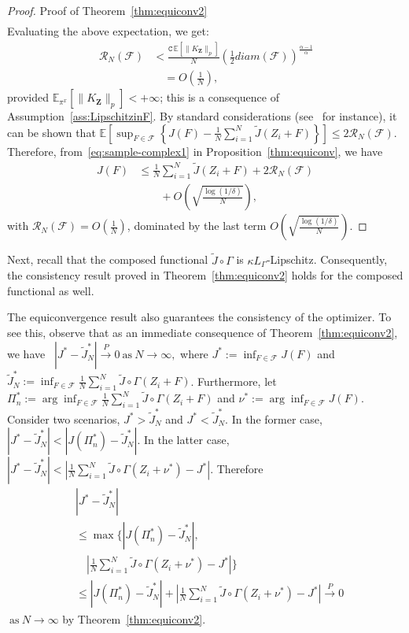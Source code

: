 \documentclass[11pt,leqno]{amsart}
\begin{document}
\begin{proof}{Proof of Theorem~\ref{thm:equiconv2}}
\begin{align*}
\end{align*}
Evaluating the above expectation, we get:
\begin{align}~\label{eq:gc}
    \mathcal{R}_N(\mathcal{F})& < \frac{\mathtt C \, \mathbb E \left[ \|K_{\mathbf Z}\|_{p} \right]}{N}\left(\frac{1}{2} diam(\mathcal F) \right)^{\frac{\alpha-1}{\alpha}}
    \\ &\nonumber\quad = O\left(\frac{1}{N}\right),
\end{align}
provided $\mathbb E_{\pi^x}\left[ \|K_{\mathbf Z}\|_{p}\right] < +\infty$; this is a consequence of Assumption~\ref{ass:LipschitzinF}. By standard considerations (see~\cite{bartlett2002rademacher} for instance), it can be shown that
\(
    \mathbb E\left[ \sup_{F \in \mathcal{F}} \left\{ J(F) - \frac{1}{N} \sum_{i=1}^N \tilde{J}(Z_i+F) \right\} \right] \leq 2 \mathcal{R}_N(\mathcal F).
\) 
Therefore, from~\eqref{eq:sample-complex1} in Proposition~\ref{thm:equiconv}, we have 
\begin{align*} 
    J(F) &\leq \frac{1}{N} \sum_{i=1}^N \tilde J(Z_i+F) + 2 \mathcal{R}_N(\mathcal{F})\\&\qquad + O\left( \sqrt{\frac{\log(1/\delta)}{N}} \right),
\end{align*}
with $\mathcal{R}_N(\mathcal F) = O\left(\frac{1}{N}\right)$, dominated by the last term $O\left( \sqrt{\frac{\log(1/\delta)}{N}} \right)$.
 \end{proof}
Next, recall that the composed functional $\tilde J \circ \Gamma$ is $\kappa L_{\Gamma}$-Lipschitz. Consequently, the consistency result proved in Theorem~\ref{thm:equiconv2} holds for the composed functional as well. 

The equiconvergence result also guarantees the consistency of the optimizer. To see this, observe that as an immediate consequence of Theorem~\ref{thm:equiconv2}, we have~%
\(
     | J^* - \tilde{J}_N^*| \stackrel{P}{\to} 0~\text{as}~N \to \infty,
\)
where $J^* := \inf_{F \in \mathcal{F}} J(F)$ and $\tilde J_N^* := \inf_{F \in \mathcal{F}} \frac{1}{N} \sum_{i=1}^N \tilde{J}\circ\Gamma(Z_i+F)$. Furthermore, let $\Pi_n^* := \arg\inf_{F \in \mathcal{F}} \frac{1}{N} \sum_{i=1}^N \tilde{J}\circ\Gamma(Z_i+F)$ and $\nu^* := \arg\inf_{F \in \mathcal{F}} J(F)$. Consider two scenarios, $J^*>\tilde J_N^*$ and $J^*<\tilde J_N^*$. In the former case, $|J^*-\tilde J_N^*|<|J(\Pi_n^* )-\tilde J_N^*|$. In the latter case,  $|J^*-\tilde J_N^*|<|\frac{1}{N} \sum_{i=1}^N \tilde{J}\circ\Gamma(Z_i+\nu^*)-J^*|$. Therefore
\begin{align*}
 &|J^*-\tilde J_N^*|\\
    &\leq\max\Bigg\{ \left|J(\Pi_n^* )-\tilde J_N^* \right|,\\
    &\quad\left|\frac{1}{N} \sum_{i=1}^N \tilde{J}\circ\Gamma(Z_i+\nu^*)-J^* \right|\Bigg\}\\
    &\leq |J(\Pi_n^* )-\tilde J_N^*|+\left|\frac{1}{N} \sum_{i=1}^N \tilde{J}\circ\Gamma(Z_i+\nu^*)-J^* \right|
    \stackrel{P}{\to} 0
\end{align*}
$~\text{as}~N \to \infty$ by Theorem~\ref{thm:equiconv2}.
\end{document}
